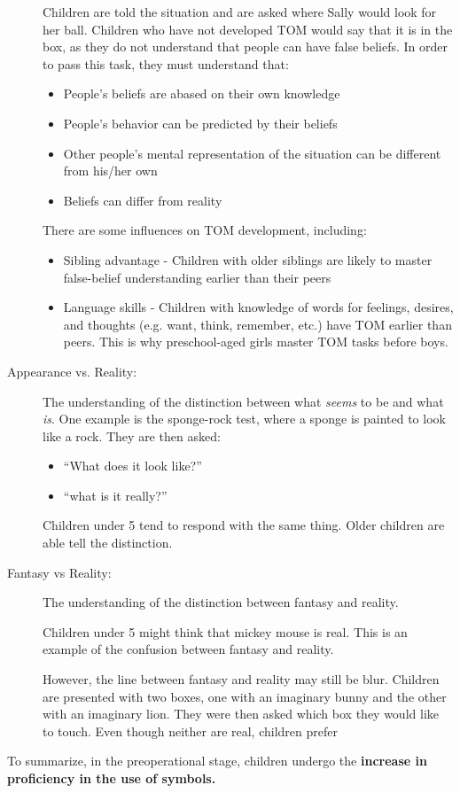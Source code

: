 \documentclass[../main/main.tex]{subfiles}
\begin{document}
\begin{description}
        Children are told the situation and are asked where Sally would look for her ball. Children who have not developed TOM would say that it is in the box, as they do not understand that people can have false beliefs. In order to pass this task, they must understand that:
        \begin{itemize}
          \item People's beliefs are abased on their own knowledge
                \item People's behavior can be predicted by their beliefs
          \item Other people's mental representation of the situation can be different from his/her own
                \item Beliefs can differ from reality
        \end{itemize}
        \begin{remark}
          There are some influences on TOM development, including:
          \begin{itemize}
            \item Sibling advantage - Children with older siblings are likely to master false-belief understanding earlier than their peers
            \item Language skills - Children with knowledge of words for feelings, desires, and thoughts (e.g. want, think, remember, etc.) have TOM earlier than peers. This is why preschool-aged girls master TOM tasks before boys.
          \end{itemize}
        \end{remark}
  \item[Appearance vs. Reality:] The understanding of the distinction between what \textit{seems} to be and what \textit{is}. One example is the sponge-rock test, where a sponge is painted to look like a rock. They are then asked:
        \begin{itemize}
\item ``What does it look like?''
                \item ``what is it really?''
        \end{itemize}
        Children under 5 tend to respond with the same thing. Older children are able tell the distinction.
  \item[Fantasy vs Reality:] The understanding of the distinction between fantasy and reality.
        \begin{remark}
Children under 5 might think that mickey mouse is real. This is an example of the confusion between fantasy and reality.
        \end{remark}
        \begin{remark}
          However, the line between fantasy and reality may still be blur. Children are presented with two boxes, one with an imaginary bunny and the other with an imaginary lion. They were then asked which box they would like to touch. Even though neither are real, children prefer
        \end{remark}
\end{description}
To summarize, in the preoperational stage, children undergo the \textbf{increase in proficiency in the use of symbols.}\\
\end{document}
